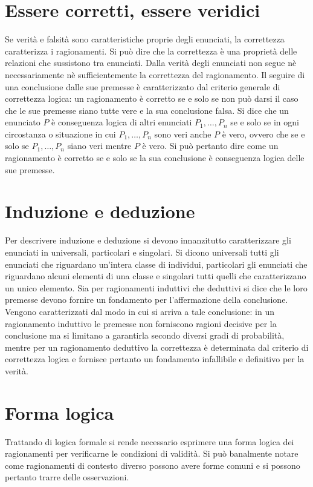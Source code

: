 \section{Essere corretti, essere veridici}
Se verit\`a e falsit\`a sono caratteristiche proprie degli enunciati, la correttezza caratterizza i ragionamenti. Si pu\`o dire che la correttezza \`e una propriet\`a delle relazioni che sussistono tra enunciati. Dalla 
verit\`a degli enunciati non segue n\`e necessariamente n\`e sufficientemente la correttezza del ragionamento. Il seguire di una conclusione dalle sue premesse \`e caratterizzato dal criterio generale di 
correttezza logica: un ragionamento \`e corretto se e solo se non pu\`o darsi il caso che le sue premesse siano tutte vere e la sua conclusione falsa. Si dice che un enunciato $P$ \`e conseguenza logica di altri 
enunciati $P_1,\dots, P_n$ se e solo se in ogni circostanza o situazione in cui $P_1,\dots, P_n$ sono veri anche $P$ \`e vero, ovvero che se e solo se $P_1,\dots, P_n$ siano veri mentre $P$ \`e vero. Si pu\`o 
pertanto dire come un ragionamento \`e corretto se e solo se la sua conclusione \`e conseguenza logica delle sue premesse. 
\section{Induzione e deduzione}
Per descrivere induzione e deduzione si devono innanzitutto caratterizzare gli enunciati in universali, particolari e singolari. Si dicono universali tutti gli enunciati che riguardano un'intera classe di individui, 
particolari gli enunciati che riguardano alcuni elementi di una classe e singolari tutti quelli che caratterizzano un unico elemento. Sia per ragionamenti induttivi che deduttivi si dice che le loro premesse devono 
fornire un fondamento per l'affermazione della conclusione. Vengono caratterizzati dal modo in cui si arriva a tale conclusione: in un ragionamento induttivo le premesse non forniscono ragioni decisive per la 
conclusione ma si limitano a garantirla secondo diversi gradi di probabilit\`a, mentre per un ragionamento deduttivo la correttezza \`e determinata dal criterio di correttezza logica e fornisce pertanto un 
fondamento infallibile e definitivo per la verit\`a. 
\section{Forma logica}
Trattando di logica formale si rende necessario esprimere una forma logica dei ragionamenti per verificarne le condizioni di validit\`a. Si pu\`o banalmente notare come ragionamenti di contesto diverso possono 
avere forme comuni e si possono pertanto trarre delle osservazioni. 
